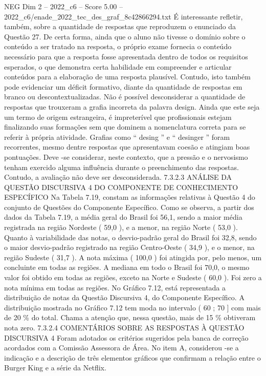\begin{textsample}{NEG Dim 2 – 2022\_c6 – Score 5.00 – 2022\_c6/enade\_2022\_tec\_des\_graf\_8c42866294.txt}
É interessante refletir, também, sobre a quantidade de respostas que reproduzem o enunciado da Questão 27.
De certa forma, ainda que o aluno não tivesse o domínio sobre o conteúdo a ser tratado na resposta, o próprio exame fornecia o conteúdo necessário para que a resposta fosse apresentada dentro de todos os requisitos esperados, o que demonstra certa habilidade em compreender e articular conteúdos para a elaboração de uma resposta plausível.
Contudo, isto também pode evidenciar um déficit formativo, diante da quantidade de respostas em branco ou descontextualizadas.
Não é possível desconsiderar a quantidade de respostas que trouxeram a grafia incorreta da palavra design.
Ainda que este seja um termo de origem estrangeira, é impreterível que profissionais estejam finalizando suas formações sem que dominem a nomenclatura correta para se referir à própria atividade.
Grafias como “ desing ” e “ desinger ” foram recorrentes, mesmo dentre respostas que apresentavam coesão e atingiam boas pontuações.
Deve -se considerar, neste contexto, que a pressão e o nervosismo tenham exercido alguma influência durante o preenchimento das respostas.
Contudo, a avaliação não deve ser desconsiderada. 7.3.2.3 ANÁLISE DA QUESTÃO DISCURSIVA 4 DO COMPONENTE DE CONHECIMENTO ESPECÍFICO Na Tabela 7.19, constam as informações relativas à Questão 4 do conjunto de Questões do Componente Específico.
Como se observa, a partir dos dados da Tabela 7.19, a média geral do Brasil foi 56,1, sendo a maior média registrada na região Nordeste ( 59,0 ), e a menor, na região Norte ( 53,0 ).
Quanto à variabilidade das notas, o desvio-padrão geral do Brasil foi 32,8, sendo o maior desvio-padrão registrado na região Centro-Oeste ( 34,9 ), e o menor, na região Sudeste ( 31,7 ).
A nota máxima ( 100,0 ) foi atingida por, pelo menos, um concluinte em todas as regiões.
A mediana em todo o Brasil foi 70,0, o mesmo valor foi obtido em todas as regiões, exceto na Norte e Sudeste ( 60,0 ).
Foi zero a nota mínima em todas as regiões.
No Gráfico 7.12, está representada a distribuição de notas da Questão Discursiva 4, do Componente Específico.
A distribuição mostrada no Gráfico 7.12 tem moda no intervalo ( 60 ; 70 ] com mais de 20 \% do total.
Chama a atenção que, nessa questão, mais de 15 \% obtiveram nota zero. 7.3.2.4 COMENTÁRIOS SOBRE AS RESPOSTAS À QUESTÃO DISCURSIVA 4 Foram adotados os critérios sugeridos pela banca de correção acordados com a Comissão Assessora de Área.
No item A, considerou -se a indicação e a descrição de três elementos gráficos que confirmam a relação entre o Burger King e a série da Netflix.

\end{textsample}
